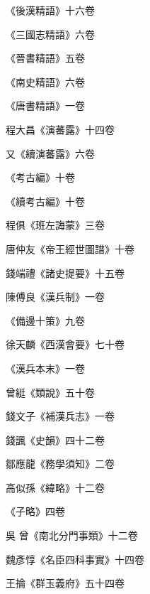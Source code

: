\begin{pinyinscope}
 《後漢精語》十六卷



 《三國志精語》六卷



 《晉書精語》五卷



 《南史精語》六卷



 《唐書精語》一卷



 程大昌《演蕃露》十四卷



 又《續演蕃露》六卷



 《考古編》十卷



 《續考古編》十卷



 程俱《班左誨蒙》三卷



 唐仲友《帝王經世圖譜》十卷



 錢端禮《諸史提要》十五卷



 陳傅良《漢兵制》一卷



 《備邊十策》九卷



 徐天麟《西漢會要》七十卷



 《漢兵本末》一卷



 曾綎《類說》五十卷



 錢文子《補漢兵志》一卷



 錢諷《史韻》四十二卷



 鄒應龍《務學須知》二卷



 高似孫《緯略》十二卷



 《子略》四卷



 吳
 曾《南北分門事類》十二卷



 魏彥惇《名臣四科事實》十四卷



 王掄《群玉義府》五十四卷




\end{pinyinscope}
